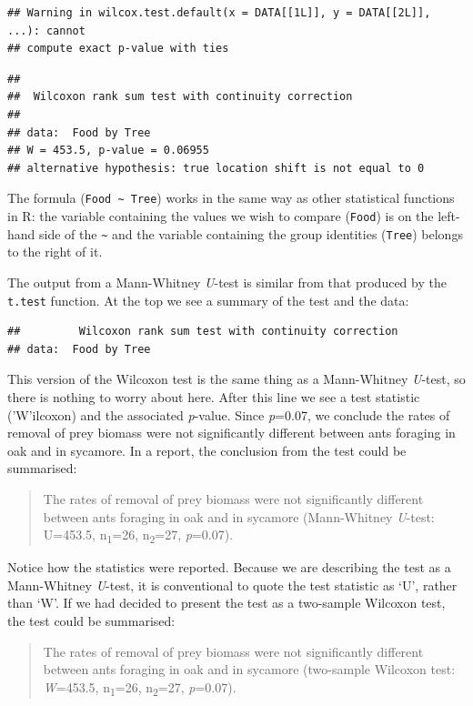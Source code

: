 \documentclass[
]{book}
\begin{document}
\begin{verbatim}
## Warning in wilcox.test.default(x = DATA[[1L]], y = DATA[[2L]], ...): cannot
## compute exact p-value with ties
\end{verbatim}

\begin{verbatim}
## 
##  Wilcoxon rank sum test with continuity correction
## 
## data:  Food by Tree
## W = 453.5, p-value = 0.06955
## alternative hypothesis: true location shift is not equal to 0
\end{verbatim}

The formula (\texttt{Food\ \textasciitilde{}\ Tree}) works in the same way as other statistical functions in R: the variable containing the values we wish to compare (\texttt{Food}) is on the left-hand side of the \texttt{\textasciitilde{}} and the variable containing the group identities (\texttt{Tree}) belongs to the right of it.

The output from a Mann-Whitney \emph{U}-test is similar from that produced by the \texttt{t.test} function. At the top we see a summary of the test and the data:

\begin{verbatim}
##         Wilcoxon rank sum test with continuity correction
## data:  Food by Tree
\end{verbatim}

This version of the Wilcoxon test is the same thing as a Mann-Whitney \emph{U}-test, so there is nothing to worry about here. After this line we see a test statistic ('W'ilcoxon) and the associated \emph{p}-value. Since \emph{p}=0.07, we conclude the rates of removal of prey biomass were not significantly different between ants foraging in oak and in sycamore. In a report, the conclusion from the test could be summarised:

\begin{quote}
The rates of removal of prey biomass were not significantly different between ants foraging in oak and in sycamore (Mann-Whitney \emph{U}-test: U=453.5, n\textsubscript{1}=26, n\textsubscript{2}=27, \emph{p}=0.07).
\end{quote}

Notice how the statistics were reported. Because we are describing the test as a Mann-Whitney \emph{U}-test, it is conventional to quote the test statistic as `U', rather than `W'. If we had decided to present the test as a two-sample Wilcoxon test, the test could be summarised:

\begin{quote}
The rates of removal of prey biomass were not significantly different between ants foraging in oak and in sycamore (two-sample Wilcoxon test: \emph{W}=453.5, n\textsubscript{1}=26, n\textsubscript{2}=27, \emph{p}=0.07).
\end{quote}
\end{document}
